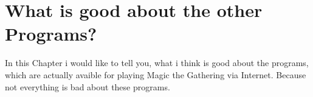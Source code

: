 \section{What is good about the other Programs?}

In this Chapter i would like to tell you, what i think is good about the programs, which are actually avaible for playing Magic the Gathering via Internet. Because not everything is bad about these programs. 


	
	
	
	
